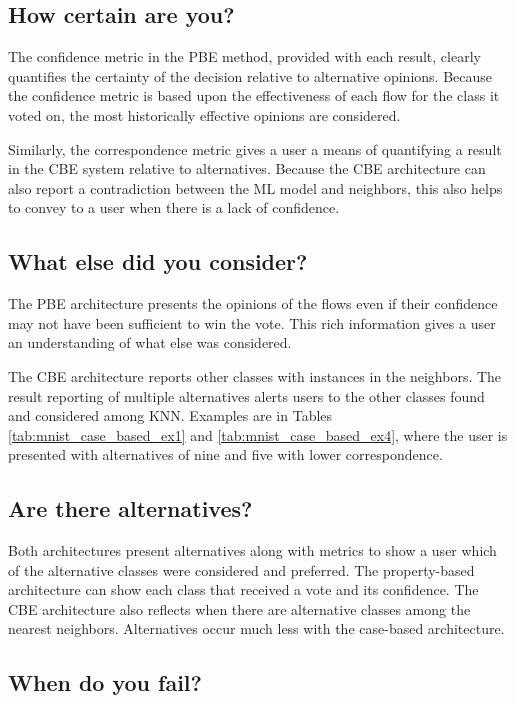 \subsection{How certain are you?}

The confidence metric in the PBE method, provided with each result, clearly
quantifies the certainty of the decision relative to alternative opinions.
Because the confidence metric is based upon the effectiveness of each flow for
the class it voted on, the most historically effective opinions are considered.

Similarly, the correspondence metric gives a user a means of quantifying a
result in the CBE system relative to alternatives. Because the CBE architecture
can also report a contradiction between the ML model and neighbors, this also
helps to convey to a user when there is a lack of confidence.

\subsection{What else did you consider?}

The PBE architecture presents the opinions of the flows even if their confidence
may not have been sufficient to win the vote. This rich information gives a user
an understanding of what else was considered.

The CBE architecture reports other classes with instances in the neighbors. The
result reporting of multiple alternatives alerts users to the other classes
found and considered among KNN. Examples are in Tables
\ref{tab:mnist_case_based_ex1} and \ref{tab:mnist_case_based_ex4}, where the
user is presented with alternatives of nine and five with lower correspondence.

\subsection{Are there alternatives?}

Both architectures present alternatives along with metrics to show a user which
of the alternative classes were considered and preferred. The property-based
architecture can show each class that received a vote and its confidence. The
CBE architecture also reflects when there are alternative classes among the
nearest neighbors. Alternatives occur much less with the case-based
architecture.

\subsection{When do you fail?}


